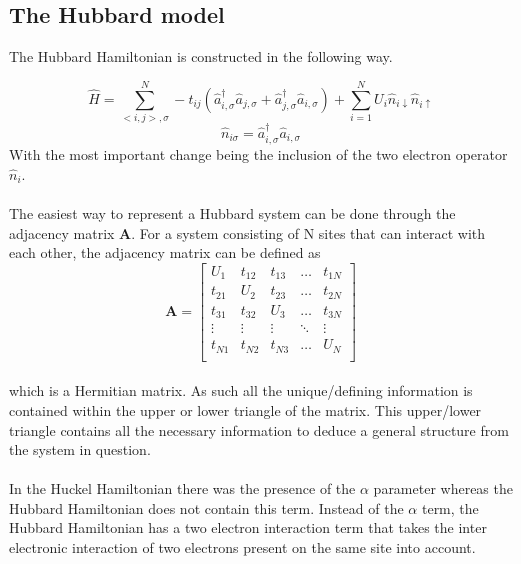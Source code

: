 \documentclass[12pt]{article}
\begin{document}
\subsection{The Hubbard model}

The Hubbard Hamiltonian is constructed in the following way.\cite{Surj1989}

\begin{equation}
\hat{H} = \sum_{<i,j>,\sigma}^{N}-t_{ij}\left (\hat{a}_{i,\sigma}^{\dagger} \hat{a}_{j,\sigma} + \hat{a}_{j,\sigma}^{\dagger} \hat{a}_{i,\sigma} \right) + \sum_{i=1}^{N}U_i \hat{n}_{i\downarrow}\hat{n}_{i\uparrow}
\end{equation}
\begin{equation*}
\hat{n}_{i\sigma} = \hat{a}_{i,\sigma}^{\dagger} \hat{a}_{i,\sigma}
\end{equation*}
With the most important change being the inclusion of the two electron operator $\hat{n}_i$.
\\
\\
The easiest way to represent a Hubbard system can be done through the adjacency matrix  \textbf{A}. For a system consisting of N sites that can interact with each other, the adjacency matrix can be defined as
\begin{equation}
\textbf{A}=
\begin{bmatrix}
U_1 & t_{12} & t_{13} & \dots & t_{1N} \\
t_{21} & U_2 &t_{23} & \dots & t_{2N} \\
t_{31} & t_{32} & U_3 & \dots & t_{3N} \\
\vdots & \vdots & \vdots & \ddots & \vdots \\
t_{N1} & t_{N2} & t_{N3} & \dots & U_N \\
\end{bmatrix}
\end{equation}
\\
which is a Hermitian matrix. As such all the unique/defining information is contained within the upper or lower triangle of the matrix.  This upper/lower triangle contains all the necessary information to deduce a general structure from the system in question. 
\\
\\
In the Huckel Hamiltonian there was the presence of the $\alpha$ parameter whereas the Hubbard Hamiltonian does not contain this term. Instead of the $\alpha$ term, the Hubbard Hamiltonian has a two electron interaction term that takes the inter electronic interaction of two electrons present on the same site into account.
\end{document}

